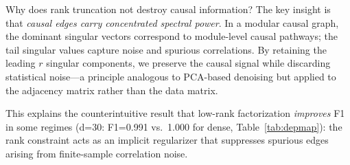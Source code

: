 Why does rank truncation not destroy causal information? The key insight is that \emph{causal edges carry concentrated spectral power}. In a modular causal graph, the dominant singular vectors correspond to module-level causal pathways; the tail singular values capture noise and spurious correlations. By retaining the leading $r$ singular components, we preserve the causal signal while discarding statistical noise---a principle analogous to PCA-based denoising but applied to the adjacency matrix rather than the data matrix.

This explains the counterintuitive result that low-rank factorization \emph{improves} F1 in some regimes (d=30: F1=0.991 vs.\ 1.000 for dense, Table~\ref{tab:depmap}): the rank constraint acts as an implicit regularizer that suppresses spurious edges arising from finite-sample correlation noise.
